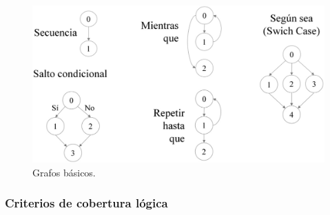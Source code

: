 \begin{figure}[H]
  \centering
  \includegraphics[width=0.6\linewidth]{Resources/ejemplosBasicosGrafos}
  \caption{Grafos básicos.}
  \label{fig:ejemplobasicografos}
\end{figure}

\subsubsection{Criterios de cobertura lógica}

